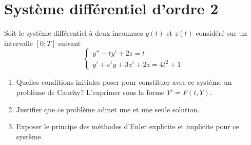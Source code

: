 \documentclass[a4paper]{article}
\begin{document}
\section{Système différentiel  d'ordre 2}
 Soit le système différentiel à deux inconnues $y(t)$ et $z(t)$ considéré sur un intervalle $[0; T]$ suivant
\[
\left\{\begin{array}{l}
y''-ty'+2z=t\\
y'+e^ty+3z'+2z=4t^2+1
\end{array}\right.
\]
\begin{enumerate}
\item Quelles conditions initiales poser pour constituer avec ce système un problème de Cauchy? L'exprimer sous la forme $Y' = F(t,Y)$.
\item Justifier que ce problème admet une et une seule solution.
\item Exposer le principe des méthodes d'Euler explicite et implicite pour ce système.
\end{enumerate}
\end{document}
